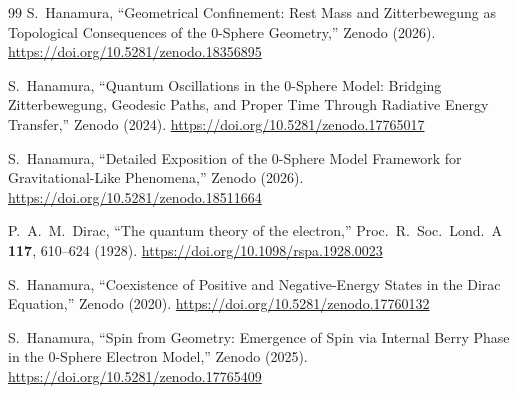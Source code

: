 \documentclass[12pt,letterpaper]{article}
\begin{document}
\begin{thebibliography}{99}
S.~Hanamura,
``Geometrical Confinement: Rest Mass and Zitterbewegung as Topological Consequences of the 0-Sphere Geometry,''
Zenodo (2026).
\href{https://doi.org/10.5281/zenodo.18356895}{https://doi.org/10.5281/zenodo.18356895}

S.~Hanamura,
``Quantum Oscillations in the 0-Sphere Model: Bridging Zitterbewegung, Geodesic Paths, and Proper Time Through Radiative Energy Transfer,''
Zenodo (2024).
\href{https://doi.org/10.5281/zenodo.17765017}{https://doi.org/10.5281/zenodo.17765017}

S.~Hanamura,
``Detailed Exposition of the 0-Sphere Model Framework for Gravitational-Like Phenomena,''
Zenodo (2026).
\href{https://doi.org/10.5281/zenodo.18511664}{https://doi.org/10.5281/zenodo.18511664}

P.~A.~M.~Dirac,
``The quantum theory of the electron,''
Proc.\ R.\ Soc.\ Lond.\ A \textbf{117}, 610--624 (1928).
\href{https://doi.org/10.1098/rspa.1928.0023}{https://doi.org/10.1098/rspa.1928.0023}

S.~Hanamura,
``Coexistence of Positive and Negative-Energy States in the Dirac Equation,''
Zenodo (2020).
\href{https://doi.org/10.5281/zenodo.17760132}{https://doi.org/10.5281/zenodo.17760132}

S.~Hanamura,
``Spin from Geometry: Emergence of Spin via Internal Berry Phase in the 0-Sphere Electron Model,''
Zenodo (2025).
\href{https://doi.org/10.5281/zenodo.17765409}{https://doi.org/10.5281/zenodo.17765409}

\end{thebibliography}

\end{document}

